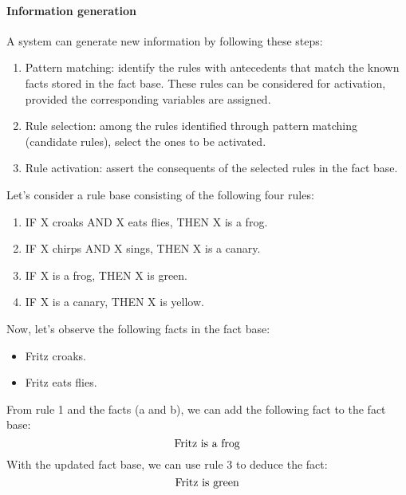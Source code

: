 \paragraph*{Information generation}
A system can generate new information by following these steps:
\begin{enumerate}
    \item Pattern matching: identify the rules with antecedents that match the known facts stored in the fact base. 
        These rules can be considered for activation, provided the corresponding variables are assigned.
    \item Rule selection: among the rules identified through pattern matching (candidate rules), select the ones to be activated.
    \item Rule activation: assert the consequents of the selected rules in the fact base.
\end{enumerate}
\begin{example}
    Let's consider a rule base consisting of the following four rules:
    \begin{enumerate}
        \item IF X croaks AND X eats flies, THEN X is a frog.
        \item IF X chirps AND X sings, THEN X is a canary.
        \item IF X is a frog, THEN X is green.
        \item IF X is a canary, THEN X is yellow.
    \end{enumerate}
    Now, let's observe the following facts in the fact base:
    \begin{itemize}
        \item Fritz croaks.
        \item Fritz eats flies.
    \end{itemize}
    From rule 1 and the facts (a and b), we can add the following fact to the fact base:
    \[\textnormal{Fritz is a frog}\]
    With the updated fact base, we can use rule 3 to deduce the fact:
    \[\textnormal{Fritz is green}\]
\end{example}